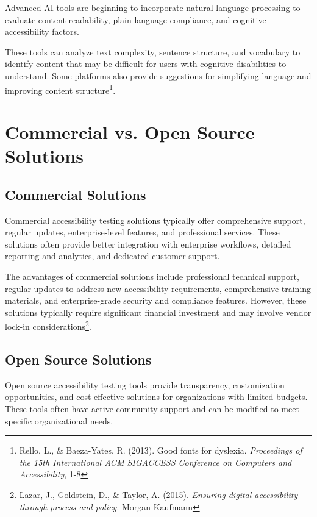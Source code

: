 Advanced AI tools are beginning to incorporate natural language processing to evaluate content readability, plain language compliance, and cognitive accessibility factors.

These tools can analyze text complexity, sentence structure, and vocabulary to identify content that may be difficult for users with cognitive disabilities to understand. Some platforms also provide suggestions for simplifying language and improving content structure\footnote{Rello, L., \& Baeza-Yates, R. (2013). Good fonts for dyslexia. \textit{Proceedings of the 15th International ACM SIGACCESS Conference on Computers and Accessibility}, 1-8}.

\section{Commercial vs. Open Source Solutions}

\subsection{Commercial Solutions}

Commercial accessibility testing solutions typically offer comprehensive support, regular updates, enterprise-level features, and professional services. These solutions often provide better integration with enterprise workflows, detailed reporting and analytics, and dedicated customer support.

The advantages of commercial solutions include professional technical support, regular updates to address new accessibility requirements, comprehensive training materials, and enterprise-grade security and compliance features. However, these solutions typically require significant financial investment and may involve vendor lock-in considerations\footnote{Lazar, J., Goldstein, D., \& Taylor, A. (2015). \textit{Ensuring digital accessibility through process and policy}. Morgan Kaufmann}.

\subsection{Open Source Solutions}

Open source accessibility testing tools provide transparency, customization opportunities, and cost-effective solutions for organizations with limited budgets. These tools often have active community support and can be modified to meet specific organizational needs.

